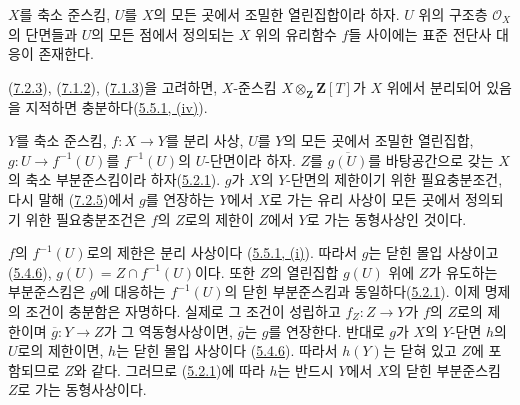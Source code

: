 \begin{corollary}[7.2.6]
\label{I.7.2.6-ko}
$X$를 축소 준스킴, $U$를 $X$의 모든 곳에서 조밀한 열린집합이라 하자.
$U$ 위의 구조층 $\mathscr{O}_X$의 단면들과 $U$의 모든 점에서 정의되는
$X$ 위의 유리함수 $f$들 사이에는 표준 전단사 대응이 존재한다.
\end{corollary}

(\hyperref[I.7.2.3-ko]{7.2.3}), (\hyperref[I.7.1.2-ko]{7.1.2}),
(\hyperref[I.7.1.3-ko]{7.1.3})을 고려하면,
$X$-준스킴 $X\otimes_{\mathbf Z}\mathbf Z[T]$가 $X$ 위에서 분리되어
있음을 지적하면 충분하다(\hyperref[I.5.5.1-ko]{5.5.1, (iv)}).

\begin{corollary}[7.2.7]
\label{I.7.2.7-ko}
$Y$를 축소 준스킴, $f:X\to Y$를 분리 사상, $U$를 $Y$의 모든 곳에서
조밀한 열린집합, $g:U\to f^{-1}(U)$를 $f^{-1}(U)$의 $U$-단면이라
하자. $Z$를 $\overline{g(U)}$를 바탕공간으로 갖는 $X$의 축소
부분준스킴이라 하자(\hyperref[I.5.2.1-ko]{5.2.1}). $g$가 $X$의
$Y$-단면의 제한이기 위한 필요충분조건, 다시 말해
(\hyperref[I.7.2.5-ko]{7.2.5})에서 $g$를 연장하는 $Y$에서 $X$로 가는
유리 사상이 모든 곳에서 정의되기 위한 필요충분조건은 $f$의 $Z$로의
제한이 $Z$에서 $Y$로 가는 동형사상인 것이다.
\end{corollary}

$f$의 $f^{-1}(U)$로의 제한은 분리 사상이다
(\hyperref[I.5.5.1-ko]{5.5.1, (i)}). 따라서 $g$는 닫힌 몰입 사상이고
(\hyperref[I.5.4.6-ko]{5.4.6}),
$g(U)=Z\cap f^{-1}(U)$이다. 또한 $Z$의 열린집합 $g(U)$ 위에 $Z$가
유도하는 부분준스킴은 $g$에 대응하는 $f^{-1}(U)$의 닫힌 부분준스킴과
동일하다(\hyperref[I.5.2.1-ko]{5.2.1}). 이제 명제의 조건이 충분함은
자명하다. 실제로 그 조건이 성립하고 $f_Z:Z\to Y$가 $f$의 $Z$로의
제한이며 $\overline g:Y\to Z$가 그 역동형사상이면, $\overline g$는
$g$를 연장한다. 반대로 $g$가 $X$의 $Y$-단면 $h$의 $U$로의 제한이면,
$h$는 닫힌 몰입 사상이다
(\hyperref[I.5.4.6-ko]{5.4.6}). 따라서 $h(Y)$는 닫혀 있고 $Z$에
포함되므로 $Z$와 같다. 그러므로 (\hyperref[I.5.2.1-ko]{5.2.1})에 따라
$h$는 반드시 $Y$에서 $X$의 닫힌 부분준스킴 $Z$로 가는 동형사상이다.

